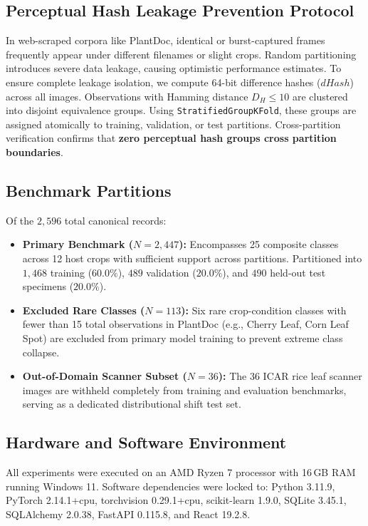 \documentclass[conference]{IEEEtran}
\begin{document}
\subsection{Perceptual Hash Leakage Prevention Protocol}
In web-scraped corpora like PlantDoc, identical or burst-captured frames frequently appear under different filenames or slight crops. Random partitioning introduces severe data leakage, causing optimistic performance estimates. To ensure complete leakage isolation, we compute 64-bit difference hashes ($dHash$)~\cite{zauner2010dhash} across all images. Observations with Hamming distance $D_H \le 10$ are clustered into disjoint equivalence groups. Using \texttt{StratifiedGroupKFold}, these groups are assigned atomically to training, validation, or test partitions. Cross-partition verification confirms that \textbf{zero perceptual hash groups cross partition boundaries}.

\subsection{Benchmark Partitions}
Of the $2,596$ total canonical records:
\begin{itemize}
    \item \textbf{Primary Benchmark ($N=2,447$):} Encompasses 25 composite classes across 12 host crops with sufficient support across partitions. Partitioned into $1,468$ training ($60.0\%$), $489$ validation ($20.0\%$), and $490$ held-out test specimens ($20.0\%$).
    \item \textbf{Excluded Rare Classes ($N=113$):} Six rare crop-condition classes with fewer than 15 total observations in PlantDoc (e.g., Cherry Leaf, Corn Leaf Spot) are excluded from primary model training to prevent extreme class collapse.
    \item \textbf{Out-of-Domain Scanner Subset ($N=36$):} The 36 ICAR rice leaf scanner images are withheld completely from training and evaluation benchmarks, serving as a dedicated distributional shift test set.
\end{itemize}

\subsection{Hardware and Software Environment}
All experiments were executed on an AMD Ryzen 7 processor with 16\,GB RAM running Windows 11. Software dependencies were locked to: Python 3.11.9, PyTorch 2.14.1+cpu, torchvision 0.29.1+cpu, scikit-learn 1.9.0, SQLite 3.45.1, SQLAlchemy 2.0.38, FastAPI 0.115.8, and React 19.2.8.
\end{document}
